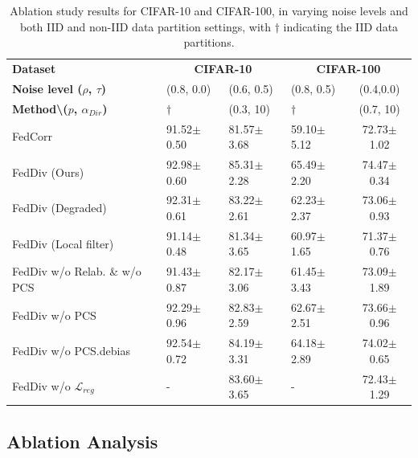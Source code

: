 \documentclass[letterpaper]{article} %
\begin{document}
\begin{table}[t]
    \centering
    \tiny
    \begin{tabular}{l|p{0.90cm}<{\centering}p{0.90cm}<{\centering}p{0.90cm}<{\centering}c}
    \toprule
    \midrule
    \textbf{Dataset} & \multicolumn{2}{c}{\textbf{CIFAR-10}} & \multicolumn{2}{c}{\textbf{CIFAR-100}} \\
    \textbf{Noise level ($\rho$, $\tau$)} & (0.8, 0.0) & (0.6, 0.5) & (0.8, 0.5) & (0.4,0.0) \\
    \textbf{Method\textbackslash ($p$, $\alpha_{Dir}$) }& $\dagger$ & (0.3, 10) & $\dagger$ & (0.7, 10) \\
    \midrule
    FedCorr~\cite{xu2022fedcorr}   & 91.52$\pm$0.50 & 81.57$\pm$3.68 &  59.10$\pm$5.12     & 72.73$\pm$1.02 \\
    FedDiv (Ours)                  & 92.98$\pm$0.60 & 85.31$\pm$2.28 &  65.49$\pm$2.20     & 74.47$\pm$0.34 \\
    \midrule
    FedDiv (Degraded)              & 92.31$\pm$0.61 & 83.22$\pm$2.61 &  62.23$\pm$2.37     & 73.06$\pm$0.93 \\
    FedDiv (Local filter)          & 91.14$\pm$0.48 & 81.34$\pm$3.65 &  60.97$\pm$1.65     & 71.37$\pm$0.76 \\
    \midrule
    FedDiv w/o Relab. \& w/o PCS   & 91.43$\pm$0.87 & 82.17$\pm$3.06 &  61.45$\pm$3.43     & 73.09$\pm$1.89 \\
    FedDiv w/o PCS                 & 92.29$\pm$0.96 & 82.83$\pm$2.59 &  62.67$\pm$2.51     & 73.66$\pm$0.96 \\
    FedDiv w/o PCS.debias          & 92.54$\pm$0.72 & 84.19$\pm$3.31 &  64.18$\pm$2.89     & 74.02$\pm$0.65 \\
    FedDiv w/o $\mathcal{L}_{reg}$ & -              & 83.60$\pm$3.65 &   -                 & 72.43$\pm$1.29 \\
    \bottomrule
    \end{tabular}%
    
    \caption{Ablation study results for CIFAR-10 and CIFAR-100, in varying noise levels and both IID and non-IID data partition settings, with $\dagger$ indicating the IID data partitions.}
    \label{Table:Ablation}%
    
\end{table}%

\subsection{Ablation Analysis}
\end{document}
